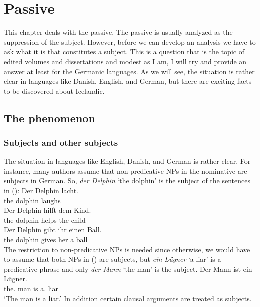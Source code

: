 \chapter{Passive}
\label{chap-case}


This chapter deals with the passive. The passive is usually analyzed as the suppression of the
subject. However, before we can develop an analysis we have to ask what it is that constitutes a
subject. This is a question that is the topic of edited volumes and dissertations and modest as I
am, I will try and provide an answer at least for the Germanic languages. As we will see, the
situation is rather clear in languages like Danish, English, and German, but there are exciting
facts to be discovered about Icelandic. 


\section{The phenomenon}


\subsection{Subjects and other subjects}
\label{sec-subj-properties}
\label{sec-icelandic-quirky-subj}

The situation in languages like English, Danish, and German is rather clear. For instance, many
authors assume that non-predicative NPs in the nominative are subjects in German. So, \emph{der
  Delphin} `the dolphin' is the subject of the sentences in (): 
\eal
\ex 
\gll Der Delphin lacht.\\
     the dolphin laughs\\\german
\ex 
\gll Der Delphin hilft dem Kind.\\
     the dolphin helps the child\\
\ex 
\gll Der Delphin gibt  ihr einen Ball.\\
     the dolphin gives her a ball\\
\zl
The restriction to non-predicative NPs is needed since otherwise, we would have to assume that both
NPs in () are subjects, but \emph{ein Lügner} `a liar' is a predicative phrase and only
\emph{der Mann} `the man' is the subject.
\ea
\gll Der Mann ist ein Lügner.\\
     the.\NOM{} man is a.\NOM{} liar\\\german
\glt `The man is a liar.'
\z
In addition certain clausal arguments are treated as subjects.

